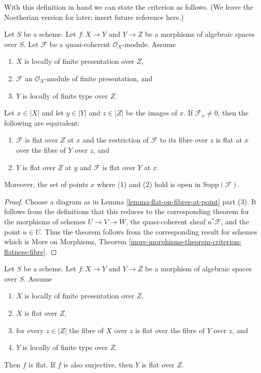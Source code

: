 \noindent
With this definition in hand we can state the criterion as follows.
(We leave the Noetherian version for later; insert future reference here.)

\begin{theorem}
\label{theorem-criterion-flatness-fibre}
Let $S$ be a scheme.
Let $f : X \to Y$ and $Y \to Z$ be a morphisms of algebraic spaces over $S$.
Let $\mathcal{F}$ be a quasi-coherent $\mathcal{O}_X$-module.
Assume
\begin{enumerate}
\item $X$ is locally of finite presentation over $Z$,
\item $\mathcal{F}$ an $\mathcal{O}_X$-module of finite presentation, and
\item $Y$ is locally of finite type over $Z$.
\end{enumerate}
Let $x \in |X|$ and let $y \in |Y|$ and $z \in |Z|$ be the images of
$x$. If $\mathcal{F}_{\overline{x}} \not = 0$, then the following are
equivalent:
\begin{enumerate}
\item $\mathcal{F}$ is flat over $Z$ at $x$ and
the restriction of $\mathcal{F}$ to its fibre over $z$
is flat at $x$ over the fibre of $Y$ over $z$, and
\item $Y$ is flat over $Z$ at $y$ and $\mathcal{F}$ is
flat over $Y$ at $x$.
\end{enumerate}
Moreover, the set of points $x$ where (1) and (2) hold is open in
$\text{Supp}(\mathcal{F})$.
\end{theorem}

\begin{proof}
Choose a diagram as in
Lemma \ref{lemma-flat-on-fibres-at-point} part (3).
It follows from the definitions that this reduces to the
corresponding theorem for the morphisms of schemes
$U \to V \to W$, the quasi-coherent sheaf $a^*\mathcal{F}$,
and the point $u \in U$. Thus the theorem follows from the
corresponding result for schemes which is
More on Morphisms,
Theorem \ref{more-morphisms-theorem-criterion-flatness-fibre}.
\end{proof}

\begin{lemma}
\label{lemma-morphism-between-flat}
Let $S$ be a scheme.
Let $f : X \to Y$ and $Y \to Z$ be a morphism of algebraic spaces over $S$.
Assume
\begin{enumerate}
\item $X$ is locally of finite presentation over $Z$,
\item $X$ is flat over $Z$,
\item for every $z \in |Z|$ the fibre of $X$ over $z$
is flat over the fibre of $Y$ over $z$, and
\item $Y$ is locally of finite type over $Z$.
\end{enumerate}
Then $f$ is flat. If $f$ is also surjective, then $Y$ is flat over $Z$.
\end{lemma}

